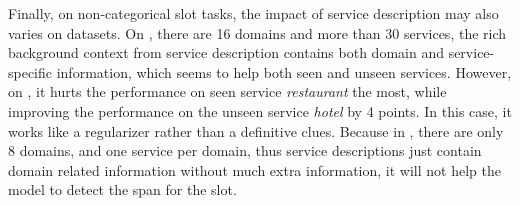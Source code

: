 Finally, on non-categorical slot tasks, the impact of service
description may also varies on datasets. On \sgdst, there are 16
domains and more than 30 services, the rich background context from
service description contains both domain and service-specific
information, which seems to help both seen and unseen
services. However, on \multiwoz, it hurts the performance on seen
service {\it restaurant} the most, while improving the performance on
the unseen service {\it hotel} by 4 points. In this case, it works
like a regularizer rather than a definitive clues. Because in
\multiwoz, there are only 8 domains, and one service per domain, thus
service descriptions just contain domain related information without
much extra information, it will not help the model to detect the span
for the slot.
%
%
%

